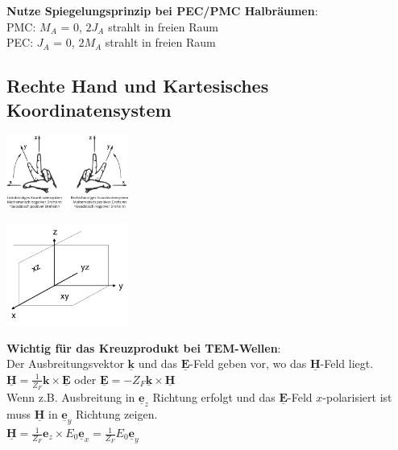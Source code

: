 \documentclass[english]{latex4ei/latex4ei_sheet}
\renewcommand{\vec}[1]{\underline{\boldsymbol{#1}}}
\begin{document}
\begin{sectionbox}
	\textbf{Nutze Spiegelungsprinzip bei PEC/PMC Halbräumen}:\\
	PMC: $M_A$ = 0, $2J_A$ strahlt in freien Raum\\
	PEC: $J_A$ = 0, $2M_A$ strahlt in freien Raum\\
\end{sectionbox}
\begin{sectionbox}
\subsection{Rechte Hand und Kartesisches Koordinatensystem}
\begin{center}\includegraphics[width = 4cm]{./img/rechte_hand_regel.png}\end{center}
\begin{center}\includegraphics[width = 4cm]{./img/ebenen_3d.png}\end{center}
\textbf{Wichtig für das Kreuzprodukt bei TEM-Wellen}:\\
Der Ausbreitungsvektor $\vec{k}$ und das $\vec{E}$-Feld geben vor, wo das $\vec{H}$-Feld liegt.\\
$\vec{H} = \frac{1}{Z_F} \mathbf{k} \times \vec{E}$ oder
$\vec{E} = - Z_F \vec{k} \times \vec{H}$\\
Wenn z.B. Ausbreitung in $\vec{e}_z$ Richtung erfolgt und das $\vec{E}$-Feld $x$-polarisiert ist muss $\vec{H}$ in $\vec{e}_y$ Richtung zeigen.\\
$\vec{H} = \frac{1}{Z_F} \mathbf{e}_z \times E_0\vec{e}_x =\frac{1}{Z_F} E_0 \vec{e}_y$
\end{sectionbox}
\end{document}

